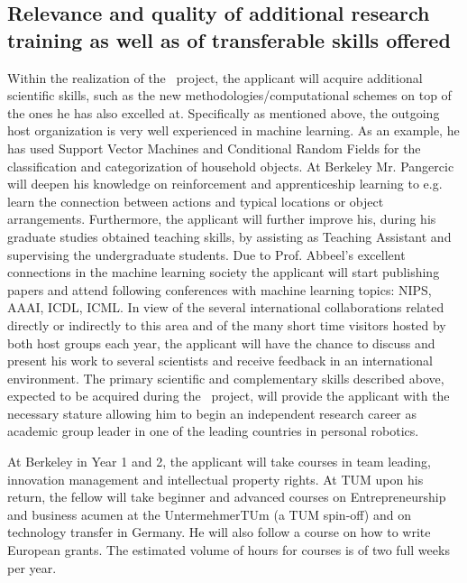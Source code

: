 \subsection{Relevance and quality of additional research training as well as of transferable skills offered}
\label{sec:trans_skills}
Within the realization of the  \ksem\ project, the applicant will acquire additional 
scientific skills, such as the new methodologies/computational schemes on top of the 
ones he has also excelled at. Specifically as mentioned above, the outgoing host organization 
is very well experienced in machine learning.  As an example, he has used Support Vector Machines
and Conditional Random Fields for the classification and categorization of household objects.
At Berkeley Mr. Pangercic will deepen his knowledge on reinforcement and apprenticeship learning
to e.g. learn the connection between actions and typical locations or object arrangements.
Furthermore, the applicant will further improve his, during his graduate studies obtained teaching 
skills, by assisting as Teaching Assistant and supervising the undergraduate students.
Due to Prof. Abbeel's excellent connections in the machine learning society the applicant 
will start publishing papers and attend following conferences with machine learning topics:
NIPS, AAAI, ICDL, ICML. In view of the several international collaborations related directly 
or indirectly to this area and of the many short time visitors hosted by both host groups each year, 
the applicant will have the  chance to discuss and present his work to several scientists and 
receive feedback in an international environment. The primary scientific and 
complementary skills described above, expected to be acquired during the \ksem\ 
project, will provide the applicant  with  the necessary stature allowing  him to begin an 
independent research career as academic group leader in one of the leading countries in personal
robotics.

At Berkeley in Year 1 and 2, the applicant will take courses in team leading, innovation management 
and intellectual property rights. At TUM upon his return, the fellow will take beginner and advanced 
courses on Entrepreneurship and business acumen at the UntermehmerTUm (a TUM spin-off) and on 
technology transfer in Germany. He will also follow a course on how to write European grants.
The estimated volume of hours for courses is of two full weeks per year.
